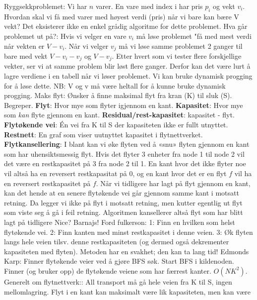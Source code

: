 \documentclass[10pt,a4paper]{article}
\begin{document}
\begin{multicols}{4}
{\noindent
\color{orange}Ryggsekkproblemet: \color{black} Vi har $n$ varer. En vare med index i har pris $p_i$ og vekt $v_i$. Hvordan skal vi få med varer med høyest verdi (pris) når vi bare kan bære V vekt? Det eksisterer ikke en enkel grådig algoritme for dette problemet. Hva går problemet ut på?: Hvis vi velger en vare $v_i$ må løse problemet "få med mest verdi når vekten er $V-v_i$. Når vi velger $v_j$ må vi løse samme problemet 2 ganger til bare med vekt $V-v_i-v_j$ og $V-v_j$. Etter hvert som vi tester flere forskjellige vekter, ser vi at samme problem blir løst flere ganger. Derfor kan det være lurt å lagre verdiene i en tabell når vi løser problemet. Vi kan bruke dynamisk progging for å løse dette. NB: V og v må være heltall for å kunne bruke dynamisk progging. 
\noindent
\color{red}Maks flyt: \color{black} 
\noindent
Ønsker å finne maksimal flyt fra kran (K) til sluk (S). Begreper. \textbf{Flyt}: Hvor mye som flyter igjennom en kant. \textbf{Kapasitet}: Hvor mye som \textit{kan} flyte gjennom en kant. \textbf{Residual/rest-kapasitet}: kapasitet - flyt. \textbf{Flytøkende vei}: Én vei fra K til S der kapasiteten ikke er fullt utnyttet. \textbf{Restnett}: En graf som viser uutnyttet kapasitet i flytnettverket. \textbf{Flytkansellering}: I blant kan vi øke flyten ved å «snu» flyten gjennom en kant som har uhensiktsmessig flyt. Hvis det flyter 3 enheter fra node 1 til node 2 vil det være en restkapasitet på 3 fra node 2 til 1. En kant hvor det ikke flyter noe vil altså ha en reversert restkapasitat på 0, og en kant hvor det er en flyt $f$ vil ha en reversert restkapasitet på $f$. Når vi tidligere har lagt på flyt gjennom en kant, kan det hende at en senere flytøkende vei går gjennom samme kant i motsatt retning. Da legger vi ikke på flyt i motsatt retning, men kutter egentlig ut flyt som viste seg å gå i feil retning. Algoritmen kansellerer altså flyt som har blitt lagt på tidligere Nice? Barnajs!
\noindent
\color{orange}Ford fulkerson:\color{black} 1: Finn en hvilken som helst flytøkende vei. 2: Finn kanten med minst restkapasitet i denne veien. 3: Øk flyten langs hele veien tilsv. denne restkapasiteten (og dermed også dekrementer kapasiteten med flyten). Metoden har en svakhet; den kan ta lang tid!
\noindent
\color{orange}Edmonds Karp:\color{black} Finner flytøkende veier ved å gjøre BFS søk. Start BFS i kildenoden. Finner (og bruker opp) de flytøkende veiene som har færrest kanter. $O(NK^2)$.
\noindent
\color{orange}Generelt om flytnettverk:\color{black}:
All transport må gå hele veien fra K til S, ingen mellomlagring. Flyt i en kant kan maksimalt være lik kapasiteten, men kan være
}
\end{multicols}
\end{document}

